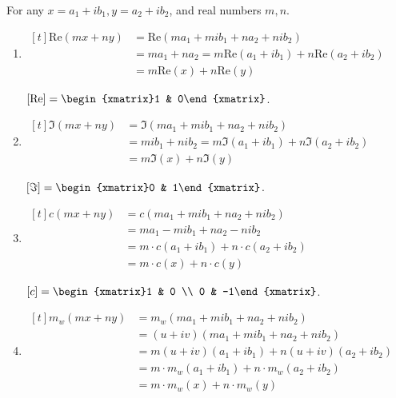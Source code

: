 \begin{exercise}{20}
  For any $x = a_1+ib_1, y = a_2+ib_2$, and real numbers $m, n$.
  \def \Re{\mathrm{Re}}
  \def \C{c}
  \def \Mw{m_w}
  
  \begin{enumerate}
    \item $\begin{aligned}[t]
            \Re(mx+ny) &= \Re(ma_1+mib_1+na_2+nib_2) \\
                       &= ma_1 + na_2 = m\Re(a_1+ib_1) + n\Re(a_2 + ib_2) \\
                       &= m\Re(x) + n\Re(y)
          \end{aligned}$
                       
          $[\Re] = \begin{xmatrix}1 & 0\end{xmatrix}$.
          
    \item $\begin{aligned}[t]
            \Im(mx+ny) &= \Im(ma_1+mib_1+na_2+nib_2) \\
                       &= mib_1 + nib_2 = m\Im(a_1+ib_1) + n\Im(a_2 + ib_2) \\
                       &= m\Im(x) + n\Im(y)
          \end{aligned}$
                       
          $[\Im] = \begin{xmatrix}0 & 1\end{xmatrix}$.
          
    \item $\begin{aligned}[t]
            \C(mx+ny) &= \C(ma_1+mib_1+na_2+nib_2) \\
                      &= ma_1-mib_1+na_2-nib_2 \\
                      &= m \cdot \C(a_1+ib_1)+n \cdot \C(a_2+ib_2) \\
                      &= m \cdot \C(x) + n \cdot \C(y)
          \end{aligned}$
          
          $[\C] = \begin{xmatrix}1 & 0 \\ 0 & -1\end{xmatrix}$.
          
    \item $\begin{aligned}[t]
            \Mw(mx+ny) &= \Mw(ma_1+mib_1+na_2+nib_2) \\
                       &= (u+iv)(ma_1+mib_1+na_2+nib_2) \\
                       &= m(u+iv)(a_1+ib_1) + n(u+iv)(a_2+ib_2) \\
                       &= m \cdot \Mw(a_1+ib_1) + n \cdot \Mw(a_2+ib_2) \\
                       &= m \cdot \Mw(x) + n \cdot \Mw(y)
          \end{aligned}$
          

\end{enumerate}
\end{exercise}
